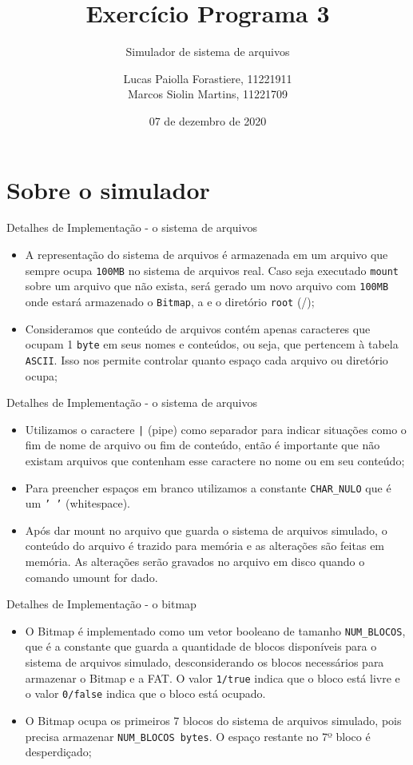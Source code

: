 \documentclass[10pt]{beamer}
\title{Exercício Programa 3}
\subtitle{Simulador de sistema de arquivos}
\institute{IME-USP}
\author{Lucas Paiolla Forastiere, 11221911\\ Marcos Siolin Martins, 11221709}
\date{07 de dezembro de 2020}
\begin{document}
    \maketitle
    \section{Sobre o simulador}
    \begin{frame}{Detalhes de Implementação - o sistema de arquivos}
        \begin{itemize}
            \justifying
            \item A representação do sistema de arquivos é armazenada em um arquivo que sempre ocupa \texttt{100MB} no sistema de arquivos real. Caso seja executado \texttt{mount} sobre um arquivo que não exista, será gerado um novo arquivo com \texttt{100MB} onde estará armazenado o \texttt{Bitmap}, a  e o diretório \texttt{root} (/);
            \item Consideramos que conteúdo de arquivos contém apenas caracteres que ocupam 1 \texttt{byte} em seus nomes e conteúdos, ou seja, que pertencem à tabela \texttt{ASCII}. Isso nos permite controlar quanto espaço cada arquivo ou diretório ocupa;
        \end{itemize}
    \end{frame}
    \begin{frame}{Detalhes de Implementação - o sistema de arquivos}
        \begin{itemize}
            \justifying
            \item Utilizamos o caractere \texttt{|} (pipe) como separador para indicar situações como o fim de nome de arquivo ou fim de conteúdo, então é importante que não existam arquivos que contenham esse caractere no nome ou em seu conteúdo;
            \item Para preencher espaços em branco utilizamos a constante \texttt{CHAR\_NULO} que é um \texttt{' '} (whitespace).
            \item Após dar mount no arquivo que guarda o sistema de arquivos simulado, o conteúdo do arquivo é trazido para memória e as alterações são feitas em memória. As alterações serão gravados no arquivo em disco quando o comando umount for dado.
        \end{itemize}
    \end{frame}
    \begin{frame}{Detalhes de Implementação - o bitmap}
        \begin{itemize}
            \justifying
            \item O Bitmap é implementado como um vetor booleano de tamanho \texttt{NUM\_BLOCOS}, que é a constante que guarda a quantidade de blocos disponíveis para o sistema de arquivos simulado, desconsiderando os blocos necessários para armazenar o Bitmap e a FAT. O valor \texttt{1/true} indica que o bloco está livre e o valor \texttt{0/false} indica que o bloco está ocupado.
            \item O Bitmap ocupa os primeiros 7 blocos do sistema de arquivos simulado, pois precisa armazenar \texttt{NUM\_BLOCOS bytes}. O espaço restante no 7º bloco é desperdiçado;
        \end{itemize}
    \end{frame}
\end{document}

